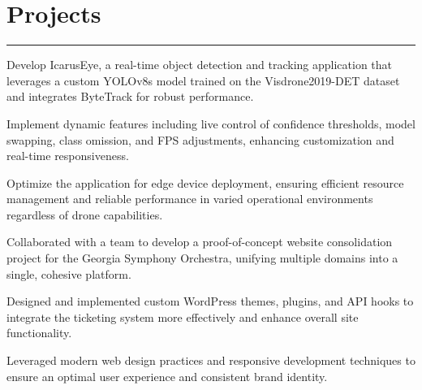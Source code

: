\documentclass[]{styling}
\begin{document}
{\begin{minipage}[t]{0.6\textwidth}
        \section*{Projects}
        \hrule
        \vspace{1 em}
        \begin{tightemize}
            \item Develop IcarusEye, a real-time object detection and tracking application that leverages 
            a custom YOLOv8s model trained on the Visdrone2019-DET dataset and integrates ByteTrack for 
            robust performance.
            \item Implement dynamic features including live control of confidence thresholds, model swapping, 
            class omission, and FPS adjustments, enhancing customization and real-time responsiveness.
            \item Optimize the application for edge device deployment, ensuring efficient resource management 
            and reliable performance in varied operational environments regardless of drone capabilities.
        \end{tightemize}
        \sectionsep

        \begin{tightemize}
            \item Collaborated with a team to develop a proof-of-concept website consolidation project for the 
            Georgia Symphony Orchestra, unifying multiple domains into a single, cohesive platform.
            \item Designed and implemented custom WordPress themes, plugins, and API hooks to integrate the 
            ticketing system more effectively and enhance overall site functionality.
            \item Leveraged modern web design practices and responsive development techniques to ensure an 
            optimal user experience and consistent brand identity.
        \end{tightemize}
        \sectionsep
    \end{minipage}
}

\noindent\usebox{\ColA}\hfill\usebox{\ColB}
\end{document}
